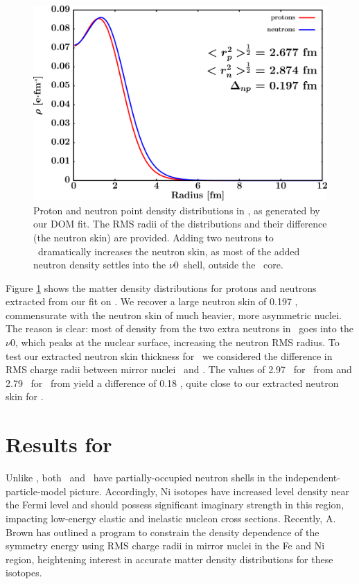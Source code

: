 \begin{figure}[tb]
    \centering
    \includegraphics[width=\textwidth]{figures/o18_matterDensity.png}
    \caption[Proton and neutron matter density distributions in \oEight]
    {
        Proton and neutron point density distributions in \oEight, as
        generated by our DOM fit. The RMS radii of the distributions and their
        difference (the neutron skin) are provided. Adding two neutrons to \oSix\ dramatically
        increases the neutron skin, as most of the added neutron density settles into
        the $\nu$0\dFive\ shell, outside the \oSix\ core.
    }
    \label{O18MatterDistribution}
\end{figure}

Figure \ref{O18MatterDistribution} shows the matter density distributions for protons
and neutrons extracted from our fit on \oEight. We recover a large neutron skin of
0.197 \femto\meter, commensurate with the neutron skin of much heavier,
more asymmetric nuclei. The reason is clear: most
of density from the two extra neutrons in \oEight\ goes into the
$\nu$0\dFive, which peaks at the nuclear surface, increasing the neutron RMS
radius. To test our extracted neutron skin thickness for \oEight\, we considered 
the difference in RMS charge radii between mirror nuclei \neEight\ and \oEight.
The values of 2.97 \femto\meter\ for \neEight\ from \cite{Marinova2011} and
2.79 \femto\meter\ for \oEight\ from \cite{DeVries1987, Brown1979}
yield a difference of 0.18
\femto\meter, quite close to our extracted neutron skin for \oEight.

\section{Results for \niEightFour}
Unlike \caAughtEight, both \niEight\ and \niFour\ have partially-occupied neutron shells in the
independent-particle-model picture. Accordingly, Ni isotopes have increased level density near the
Fermi level and should possess significant imaginary strength in this region, impacting
low-energy elastic and inelastic nucleon cross sections. Recently, A. Brown has outlined a
program to constrain the density dependence of the symmetry energy using RMS charge radii in mirror
nuclei in the Fe and Ni region, heightening interest in accurate
matter density distributions for these isotopes.

